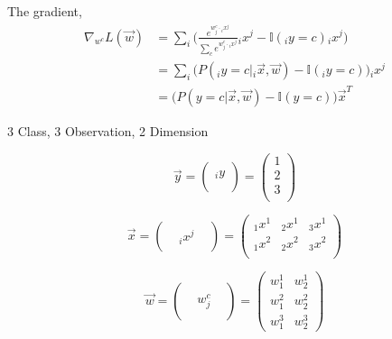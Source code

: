 \documentclass[12pt,a4paper]{article}%
\theoremstyle{definition}
\theoremstyle{plain}
\numberwithin{equation}{section}
\newcounter{subsubsubsection}[subsubsection]
\begin{document}
The gradient, 
\begin{align*}
\nabla_{ w^{c} } L(\vec{w}) &= \sum\limits_{i} \big( \frac{e^{w^{c}_{j} \cdot {}_ix^{j}}} { \sum\limits_{c} e^{ w^{c}_{j} \cdot {}_ix^{j} } } {}_ix^{j} - \mathbb{I}({}_iy=c) {}_ix^{j}  \big)  \\ 
														       &= \sum\limits_{i} \big(  P( {}_iy = c |  {}_i\vec{x}, \vec{w})  - \mathbb{I}({}_iy=c)   \big) {}_ix^{j} \\
														       &=  \big(  P( y = c |  \vec{x}, \vec{w})  - \mathbb{I}(y=c)   \big)  \vec{x}^{T}
\end{align*}

3 Class, 3 Observation, 2 Dimension

\begin{equation}
\vec{y} = \begin{pmatrix}
           \\
  {}_iy \\
            \\
\end{pmatrix} =  \begin{pmatrix}
         1  \\
         2 \\
         3  \\
\end{pmatrix}   
\end{equation} 

\begin{equation}
\vec{x} = \begin{pmatrix}
  &   &  \\
  &  {}_ix^{j} &  \\
 &   &
\end{pmatrix}   = \begin{pmatrix}
{}_1x^{1} & {}_2x^{1}    & {}_3x^{1}  \\
{}_1x^{2} & {}_2x^{2} & {}_3x^{2}  \\
\end{pmatrix}
\end{equation} 

\begin{equation}
\vec{w} = \begin{pmatrix}
  &   &  \\
  &  w_{j}^{c} &  \\
 &   &
\end{pmatrix} = \begin{pmatrix}
w_{1}^{1} & w_{2}^{1}     \\
w_{1}^{2} & w_{2}^{2}   \\
w_{1}^{3} & w_{2}^{3}   
\end{pmatrix}
\end{equation} 
\end{document}

